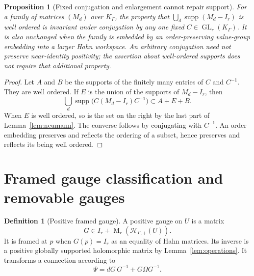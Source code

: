 \documentclass[11pt,letterpaper]{article}
\numberwithin{equation}{section}
\newtheorem{proposition}[theorem]{Proposition}
\theoremstyle{definition}
\newtheorem{definition}[theorem]{Definition}
\theoremstyle{remark}
\newcommand{\HH}{\mathcal H}
\newcommand{\supp}{\operatorname{supp}}
\newcommand{\GL}{\operatorname{GL}}
\newcommand{\Mat}{\operatorname{M}}
\newcommand{\K}{K_\Gamma}
\newcommand{\Hp}{\HH_{\Gamma,+}}
\begin{document}
\begin{proposition}[Fixed conjugation and enlargement cannot repair support]
\label{prop:conjugation}
For a family of matrices $(M_d)$ over $\K$, the property that
$\bigcup_d\supp(M_d-I_r)$ is well ordered is invariant under conjugation by
any one fixed $C\in\GL_r(\K)$. It is also unchanged when the family is
embedded by an order-preserving value-group embedding into a larger Hahn
workspace. An arbitrary conjugation need not preserve near-identity
positivity; the assertion about well-ordered supports does not require
that additional property.
\end{proposition}
\begin{proof}
Let $A$ and $B$ be the supports of the finitely many entries of $C$ and
$C^{-1}$. They are well ordered. If $E$ is the union of the supports of
$M_d-I_r$, then
\[
 \bigcup_d\supp\bigl(C(M_d-I_r)C^{-1}\bigr)\subset A+E+B.
\]
When $E$ is well ordered, so is the set on the right by the last part of
Lemma~\ref{lem:neumann}. The converse follows by conjugating with
$C^{-1}$. An order embedding preserves and reflects the ordering of a
subset, hence preserves and reflects its being well ordered.
\end{proof}

\section{Framed gauge classification and removable gauges}
\label{sec:gauge}

\begin{definition}[Positive framed gauge]
A positive gauge on $U$ is a matrix
\[
 G\in I_r+\Mat_r(\Hp(U)).
\]
It is framed at $p$ when $G(p)=I_r$ as an equality of Hahn matrices.
Its inverse is a positive globally supported holomorphic matrix by
Lemma~\ref{lem:operations}. It transforms a connection according to
\begin{equation}\label{eq:gauge}
 \Psi=dG\,G^{-1}+G\Omega G^{-1}.
\end{equation}
\end{definition}
\end{document}
